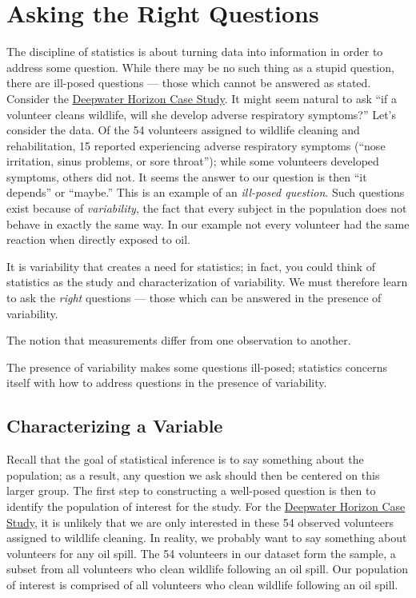 \documentclass[]{book}
\theoremstyle{plain}
\theoremstyle{mydefn}
\theoremstyle{myexmpl}
\theoremstyle{remark}
\let\BeginKnitrBlock\begin \let\EndKnitrBlock\end
\let\BeginKnitrBlock\begin \let\EndKnitrBlock\end
\begin{document}
\chapter{Asking the Right Questions}\label{Questions}

The discipline of statistics is about turning data into information in
order to address some question. While there may be no such thing as a
stupid question, there are ill-posed questions --- those which cannot be
answered as stated. Consider the
\protect\hyperlink{CaseDeepwater}{Deepwater Horizon Case Study}. It
might seem natural to ask ``if a volunteer cleans wildlife, will she
develop adverse respiratory symptoms?'' Let's consider the data. Of the
54 volunteers assigned to wildlife cleaning and rehabilitation, 15
reported experiencing adverse respiratory symptoms (``nose irritation,
sinus problems, or sore throat''); while some volunteers developed
symptoms, others did not. It seems the answer to our question is then
``it depends'' or ``maybe.'' This is an example of an \emph{ill-posed
question}. Such questions exist because of \emph{variability}, the fact
that every subject in the population does not behave in exactly the same
way. In our example not every volunteer had the same reaction when
directly exposed to oil.

It is variability that creates a need for statistics; in fact, you could
think of statistics as the study and characterization of variability. We
must therefore learn to ask the \emph{right} questions --- those which
can be answered in the presence of variability.

\BeginKnitrBlock{definition}[Variability]
\protect\hypertarget{def:defn-variability}{}{\label{def:defn-variability}
{} }The notion that measurements differ from
one observation to another.
\EndKnitrBlock{definition}

\BeginKnitrBlock{rmdkeyidea}
The presence of variability makes some questions ill-posed; statistics
concerns itself with how to address questions in the presence of
variability.
\EndKnitrBlock{rmdkeyidea}

\section{Characterizing a Variable}\label{characterizing-a-variable}

Recall that the goal of statistical inference is to say something about
the population; as a result, any question we ask should then be centered
on this larger group. The first step to constructing a well-posed
question is then to identify the population of interest for the study.
For the \protect\hyperlink{CaseDeepwater}{Deepwater Horizon Case Study},
it is unlikely that we are only interested in these 54 observed
volunteers assigned to wildlife cleaning. In reality, we probably want
to say something about volunteers for any oil spill. The 54 volunteers
in our dataset form the sample, a subset from all volunteers who clean
wildlife following an oil spill. Our population of interest is comprised
of all volunteers who clean wildlife following an oil spill.
\end{document}
